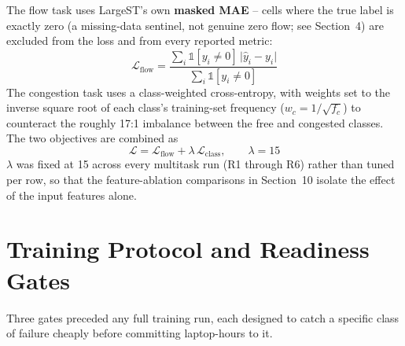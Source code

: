 \documentclass[11pt]{article}
\begin{document}
The flow task uses LargeST's own \textbf{masked MAE} -- cells where the true label is exactly
zero (a missing-data sentinel, not genuine zero flow; see Section~4) are excluded from the loss
and from every reported metric:
\begin{equation}
\mathcal{L}_{\text{flow}} = \frac{\sum_i \mathbb{1}[y_i \neq 0]\,\lvert \hat{y}_i - y_i \rvert}{\sum_i \mathbb{1}[y_i \neq 0]}
\end{equation}
The congestion task uses a class-weighted cross-entropy, with weights set to the inverse square
root of each class's training-set frequency ($w_c = 1/\sqrt{f_c}$) to counteract the roughly
17:1 imbalance between the free and congested classes. The two objectives are combined as
\begin{equation}
\mathcal{L} = \mathcal{L}_{\text{flow}} + \lambda\, \mathcal{L}_{\text{class}}, \qquad \lambda = 15
\end{equation}
$\lambda$ was fixed at 15 across every multitask run (R1 through R6) rather than tuned per row, so
that the feature-ablation comparisons in Section~10 isolate the effect of the input features
alone.

\section{Training Protocol and Readiness Gates}

Three gates preceded any full training run, each designed to catch a specific class of failure
cheaply before committing laptop-hours to it.
\end{document}
